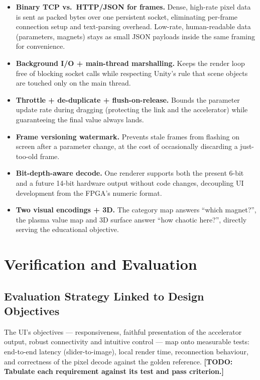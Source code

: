 \documentclass[11pt,a4paper]{article}
\newcommand{\todo}[1]{\textcolor{red!75!black}{\textbf{[TODO: #1]}}}
\begin{document}
\begin{itemize}[noitemsep]
  \item \textbf{Binary TCP vs.\ HTTP/JSON for frames.} Dense, high-rate pixel
        data is sent as packed bytes over one persistent socket, eliminating
        per-frame connection setup and text-parsing overhead. Low-rate,
        human-readable data (parameters, magnets) stays as small JSON payloads
        inside the same framing for convenience.
  \item \textbf{Background I/O + main-thread marshalling.} Keeps the render loop
        free of blocking socket calls while respecting Unity's rule that scene
        objects are touched only on the main thread.
  \item \textbf{Throttle + de-duplicate + flush-on-release.} Bounds the
        parameter update rate during dragging (protecting the link and the
        accelerator) while guaranteeing the final value always lands.
  \item \textbf{Frame versioning watermark.} Prevents stale frames from
        flashing on screen after a parameter change, at the cost of occasionally
        discarding a just-too-old frame.
  \item \textbf{Bit-depth-aware decode.} One renderer supports both the present
        6-bit and a future 14-bit hardware output without code changes,
        decoupling UI development from the FPGA's numeric format.
  \item \textbf{Two visual encodings + 3D.} The category map answers ``which
        magnet?'', the plasma value map and 3D surface answer ``how chaotic
        here?'', directly serving the educational objective.
\end{itemize}

\section{Verification and Evaluation}

\subsection{Evaluation Strategy Linked to Design Objectives}
The UI's objectives --- responsiveness, faithful presentation of the
accelerator output, robust connectivity and intuitive control --- map onto
measurable tests: end-to-end latency (slider-to-image), local render time,
reconnection behaviour, and correctness of the pixel decode against the golden
reference. \todo{Tabulate each requirement against its test and pass criterion.}
\end{document}
